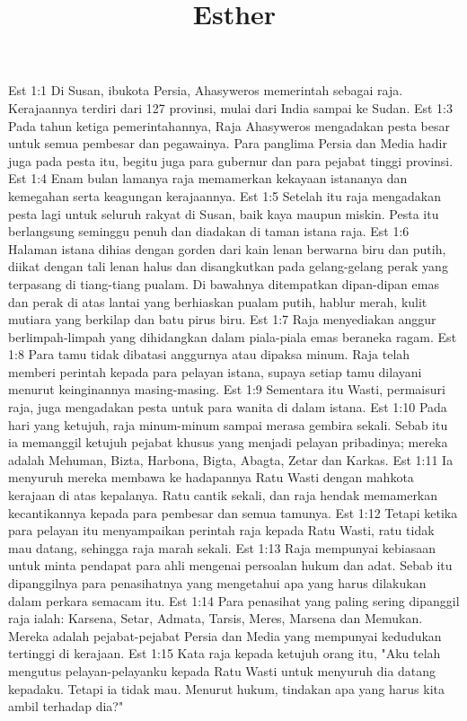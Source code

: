 

\title{Esther}

Est 1:1  Di Susan, ibukota Persia, Ahasyweros memerintah sebagai raja. Kerajaannya terdiri dari 127 provinsi, mulai dari India sampai ke Sudan.
Est 1:3  Pada tahun ketiga pemerintahannya, Raja Ahasyweros mengadakan pesta besar untuk semua pembesar dan pegawainya. Para panglima Persia dan Media hadir juga pada pesta itu, begitu juga para gubernur dan para pejabat tinggi provinsi.
Est 1:4  Enam bulan lamanya raja memamerkan kekayaan istananya dan kemegahan serta keagungan kerajaannya.
Est 1:5  Setelah itu raja mengadakan pesta lagi untuk seluruh rakyat di Susan, baik kaya maupun miskin. Pesta itu berlangsung seminggu penuh dan diadakan di taman istana raja.
Est 1:6  Halaman istana dihias dengan gorden dari kain lenan berwarna biru dan putih, diikat dengan tali lenan halus dan disangkutkan pada gelang-gelang perak yang terpasang di tiang-tiang pualam. Di bawahnya ditempatkan dipan-dipan emas dan perak di atas lantai yang berhiaskan pualam putih, hablur merah, kulit mutiara yang berkilap dan batu pirus biru.
Est 1:7  Raja menyediakan anggur berlimpah-limpah yang dihidangkan dalam piala-piala emas beraneka ragam.
Est 1:8  Para tamu tidak dibatasi anggurnya atau dipaksa minum. Raja telah memberi perintah kepada para pelayan istana, supaya setiap tamu dilayani menurut keinginannya masing-masing.
Est 1:9  Sementara itu Wasti, permaisuri raja, juga mengadakan pesta untuk para wanita di dalam istana.
Est 1:10  Pada hari yang ketujuh, raja minum-minum sampai merasa gembira sekali. Sebab itu ia memanggil ketujuh pejabat khusus yang menjadi pelayan pribadinya; mereka adalah Mehuman, Bizta, Harbona, Bigta, Abagta, Zetar dan Karkas.
Est 1:11  Ia menyuruh mereka membawa ke hadapannya Ratu Wasti dengan mahkota kerajaan di atas kepalanya. Ratu cantik sekali, dan raja hendak memamerkan kecantikannya kepada para pembesar dan semua tamunya.
Est 1:12  Tetapi ketika para pelayan itu menyampaikan perintah raja kepada Ratu Wasti, ratu tidak mau datang, sehingga raja marah sekali.
Est 1:13  Raja mempunyai kebiasaan untuk minta pendapat para ahli mengenai persoalan hukum dan adat. Sebab itu dipanggilnya para penasihatnya yang mengetahui apa yang harus dilakukan dalam perkara semacam itu.
Est 1:14  Para penasihat yang paling sering dipanggil raja ialah: Karsena, Setar, Admata, Tarsis, Meres, Marsena dan Memukan. Mereka adalah pejabat-pejabat Persia dan Media yang mempunyai kedudukan tertinggi di kerajaan.
Est 1:15  Kata raja kepada ketujuh orang itu, "Aku telah mengutus pelayan-pelayanku kepada Ratu Wasti untuk menyuruh dia datang kepadaku. Tetapi ia tidak mau. Menurut hukum, tindakan apa yang harus kita ambil terhadap dia?"

